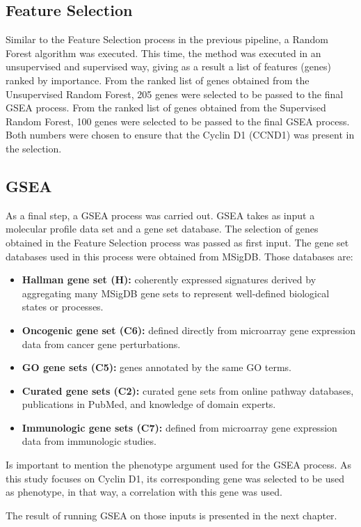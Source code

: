\subsection{Feature Selection}
Similar to the Feature Selection process in the previous pipeline, a Random Forest algorithm was executed.
This time, the method was executed in an unsupervised and supervised way, giving as a result a list of features (genes) ranked by importance.
From the ranked list of genes obtained from the Unsupervised Random Forest, 205 genes were selected to be passed to the final GSEA process.
From the ranked list of genes obtained from the Supervised Random Forest, 100 genes were selected to be passed to the final GSEA process.
Both numbers were chosen to ensure that the Cyclin D1 (CCND1) was present in the selection.

\subsection{GSEA}

As a final step, a GSEA process was carried out.
GSEA takes as input a molecular profile data set and a gene set database.
The selection of genes obtained in the Feature Selection process was passed as first input. The gene set databases used in this process were obtained from MSigDB. Those databases are:

\begin{itemize}
    \item \textbf{Hallman gene set (H):} coherently expressed signatures derived by aggregating many MSigDB gene sets to represent well-defined biological states or processes.
    \item \textbf{Oncogenic gene set (C6):} defined directly from microarray gene expression data from cancer gene perturbations.
    \item \textbf{GO gene sets (C5):} genes annotated by the same GO terms.
    \item \textbf{Curated gene sets (C2):} curated gene sets from online pathway databases, publications in PubMed, and knowledge of domain experts.
    \item \textbf{Immunologic gene sets (C7):} defined from microarray gene expression data from immunologic studies.
\end{itemize}

Is important to mention the phenotype argument used for the GSEA process.
As this study focuses on Cyclin D1, its corresponding gene was selected to be used as phenotype, in that way, a correlation with this gene was used.

The result of running GSEA on those inputs is presented in the next chapter.